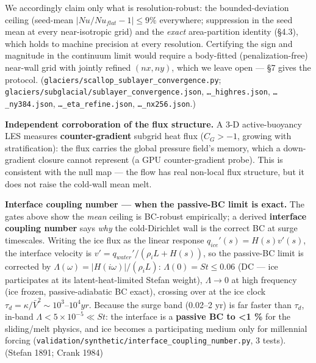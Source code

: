 \documentclass[tc, manuscript]{copernicus}
\begin{document}
We accordingly claim only what is resolution-robust: the bounded-deviation ceiling (seed-mean $|Nu/Nu_{flat}-1| \le  9\%$ everywhere; suppression in the seed mean at every near-isotropic grid) and the \emph{exact} area-partition identity (§4.3), which holds to machine precision at every resolution. Certifying the sign and magnitude in the continuum limit would require a body-fitted (penalization-free) near-wall grid with jointly refined $(nx, ny)$, which we leave open — §7 gives the protocol. (\texttt{glaciers/\allowbreak{}scallop\_\allowbreak{}sublayer\_\allowbreak{}convergence.\allowbreak{}py}; \texttt{glaciers/\allowbreak{}subglacial/\allowbreak{}sublayer\_\allowbreak{}convergence.\allowbreak{}json}, \texttt{…\_\allowbreak{}highres.\allowbreak{}json}, \texttt{…\_\allowbreak{}ny384.\allowbreak{}json}, \texttt{…\_\allowbreak{}eta\_\allowbreak{}refine.\allowbreak{}json}, \texttt{…\_\allowbreak{}nx256.\allowbreak{}json}.)

\textbf{Independent corroboration of the flux structure.} A 3-D active-buoyancy LES measures \textbf{counter-gradient} subgrid heat flux ($C_{G} > -1$, growing with stratification): the flux carries the global pressure field's memory, which a down-gradient closure cannot represent (a GPU counter-gradient probe). This is consistent with the null map — the flow has real non-local flux structure, but it does not raise the cold-wall mean melt.

\textbf{Interface coupling number — when the passive-BC limit is exact.} The gates above show the \emph{mean} ceiling is BC-robust empirically; a derived \textbf{interface coupling number} says \emph{why} the cold-Dirichlet wall is the correct BC at surge timescales. Writing the ice flux as the linear response $q_{ice}'(s)=H(s)v'(s)$, the interface velocity is $v'=q_{water}'/(\rho _{i}L+H(s))$, so the passive-BC limit is corrected by $\Lambda (\omega )=|H(i\omega )|/(\rho _{i}L)$: $\Lambda (0)=St\le 0.06$ (DC — ice participates at its latent-heat-limited Stefan weight), $\Lambda \to 0$ at high frequency (ice frozen, passive-adiabatic BC exact), crossing over at the ice clock $\tau _{d}=\kappa /\bar{V}^{2}\sim 10^{3}\mbox{--}10^{4} yr$. Because the surge band (0.02–2 yr) is far faster than $\tau _{d}$, in-band $\Lambda <5\times 10^{-5}\ll St$: the interface is a \textbf{passive BC to <1 \%} for the sliding/melt physics, and ice becomes a participating medium only for millennial forcing (\texttt{validation/\allowbreak{}synthetic/\allowbreak{}interface\_\allowbreak{}coupling\_\allowbreak{}number.\allowbreak{}py}, 3 tests). (Stefan 1891; Crank 1984)
\end{document}
